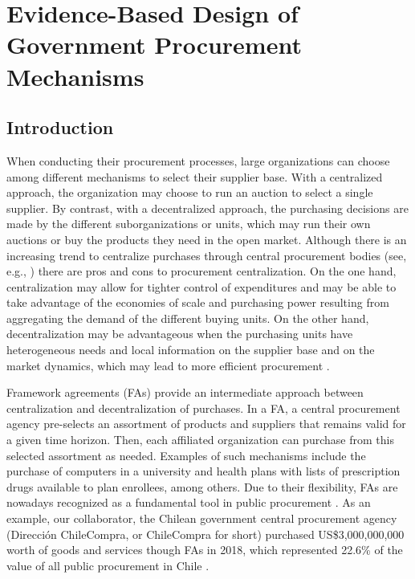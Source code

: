 \chapter{Evidence-Based Design of Government Procurement Mechanisms}

\section{Introduction}


When conducting their procurement processes, large organizations can choose among different mechanisms to select their supplier base. With a centralized approach, the organization may choose to run an auction to select a single supplier. By contrast, with a decentralized approach, the purchasing decisions are made by the different suborganizations or units, which may run their own auctions or buy the products they need in the open market. Although there is an increasing trend to centralize purchases through central procurement bodies (see,  e.g., \cite{oecd2019reforming}) there are pros and cons to procurement centralization. On the one hand, centralization may allow for tighter control of expenditures and may be able to take advantage of the economies of scale and purchasing power resulting from aggregating the demand of the different buying units. On the other hand, decentralization may be advantageous when the purchasing units have heterogeneous needs and local information on the supplier base and on the market dynamics, which may lead to more efficient procurement \citep{dimitri2006handbook}.

Framework agreements (FAs)  provide an intermediate approach between centralization and decentralization of purchases. In a FA, a central procurement agency pre-selects an assortment of products and suppliers that remains valid for a given time horizon. Then, each affiliated organization can purchase from this selected assortment as needed. Examples of such mechanisms include the purchase of computers in a university and health plans with lists of prescription drugs available to plan enrollees, among others. Due to their flexibility, FAs are nowadays  recognized as a fundamental tool in public procurement \citep{albano2016law}. {As an example, our collaborator, the Chilean government central procurement agency (Direcci\'on ChileCompra, or ChileCompra for short) purchased US\$3,000,000,000 worth of goods and services though FAs in 2018, which represented 22.6\% of the value of all public procurement in Chile} \citep{datosabiertos}.%

